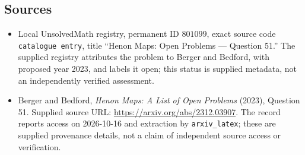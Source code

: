 \documentclass[11pt]{article}
\begin{document}
\subsection{Sources}
\begin{itemize}
\item Local UnsolvedMath registry, permanent ID \(801099\), exact source code \texttt{catalogue entry}, title ``Henon Maps: Open Problems --- Question 51.'' The supplied registry attributes the problem to Berger and Bedford, with proposed year 2023, and labels it open; this status is supplied metadata, not an independently verified assessment.
\item Berger and Bedford, \emph{Henon Maps: A List of Open Problems} (2023), Question 51. Supplied source URL: \url{https://arxiv.org/abs/2312.03907}. The record reports access on 2026-10-16 and extraction by \texttt{arxiv\_latex}; these are supplied provenance details, not a claim of independent source access or verification.
\end{itemize}
\end{document}
